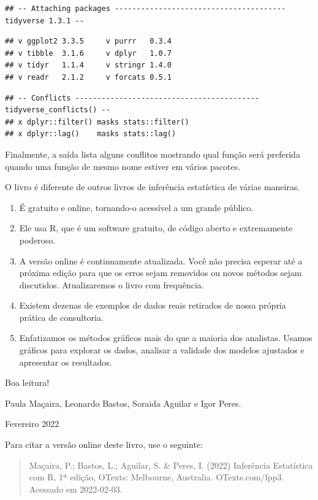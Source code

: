 \documentclass[
]{book}
\providecommand{\tightlist}{%
  \setlength{\itemsep}{0pt}\setlength{\parskip}{0pt}}
\begin{document}
\begin{verbatim}
## -- Attaching packages --------------------------------------- tidyverse 1.3.1 --
\end{verbatim}

\begin{verbatim}
## v ggplot2 3.3.5     v purrr   0.3.4
## v tibble  3.1.6     v dplyr   1.0.7
## v tidyr   1.1.4     v stringr 1.4.0
## v readr   2.1.2     v forcats 0.5.1
\end{verbatim}

\begin{verbatim}
## -- Conflicts ------------------------------------------ tidyverse_conflicts() --
## x dplyr::filter() masks stats::filter()
## x dplyr::lag()    masks stats::lag()
\end{verbatim}

Finalmente, a saída lista alguns conflitos mostrando qual função será preferida quando uma função de mesmo nome estiver em vários pacotes.

O livro é diferente de outros livros de inferência estatística de várias maneiras.

\begin{enumerate}
\def\labelenumi{\arabic{enumi}.}
\tightlist
\item
  É gratuito e online, tornando-o acessível a um grande público.
\item
  Ele usa R, que é um software gratuito, de código aberto e extremamente poderoso.
\item
  A versão online é continuamente atualizada. Você não precisa esperar até a próxima edição para que os erros sejam removidos ou novos métodos sejam discutidos. Atualizaremos o livro com frequência.
\item
  Existem dezenas de exemplos de dados reais retirados de nossa própria prática de consultoria.
\item
  Enfatizamos os métodos gráficos mais do que a maioria dos analistas. Usamos gráficos para explorar os dados, analisar a validade dos modelos ajustados e apresentar os resultados.
\end{enumerate}

Boa leitura!

Paula Maçaira, Leonardo Bastos, Soraida Aguilar e Igor Peres.

Fevereiro 2022

Para citar a versão online deste livro, use o seguinte:

\begin{quote}
Maçaira, P.; Bastos, L.; Aguilar, S. \& Peres, I. (2022) Inferência Estatística com R, 1ª edição, OTexts: Melbourne, Australia. OTexts.com/fpp3. Acessado em 2022-02-03.
\end{quote}
\end{document}
